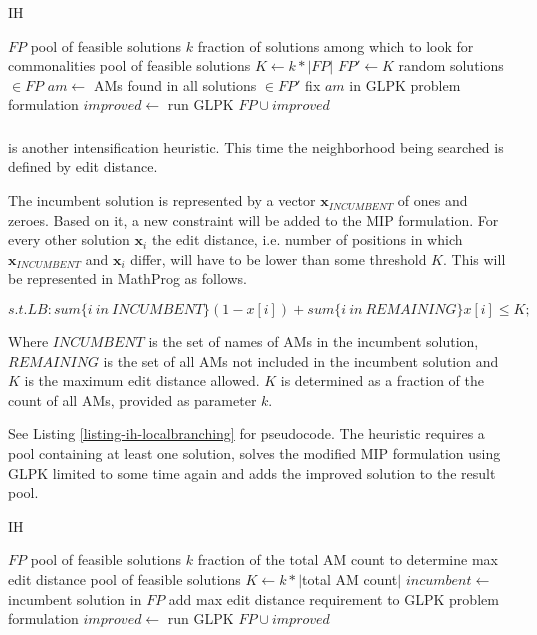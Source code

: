 \begin{algorithm}
\caption{ IH}
\label{listing-ih-crossover}
\begin{algorithmic}
\REQUIRE $FP$ pool of feasible solutions
\REQUIRE $k$ fraction of solutions among which to look for commonalities
\ENSURE pool of feasible solutions
\STATE $K \gets k * |FP|$
\STATE $FP' \gets K$ random solutions $\in FP$
\STATE $am \gets$ AMs found in all solutions $\in FP'$
\STATE fix $am$ in GLPK problem formulation
\STATE $improved \gets $ run GLPK
\RETURN $FP \cup improved$
\end{algorithmic}
\end{algorithm}

\subsubsection{}

 is another intensification heuristic. This time the neighborhood being searched is defined by edit distance.

The incumbent solution is represented by a vector $\mathbf{x}_{INCUMBENT}$ of ones and zeroes. Based on it, a new constraint will be added to the MIP formulation. For every other solution $\mathbf{x}_i$ the edit distance, i.e. number of positions in which $\mathbf{x}_{INCUMBENT}$ and $\mathbf{x}_i$ differ, will have to be lower than some threshold $K$. This will be represented in MathProg as follows.

\[s.t. LB: sum\{i\ in\ INCUMBENT\} (1 - x[i]) + sum\{i\ in\ REMAINING\} x[i] \leq K;\]

Where $INCUMBENT$ is the set of names of AMs in the incumbent solution, $REMAINING$ is the set of all AMs not included in the incumbent solution and $K$ is the maximum edit distance allowed. $K$ is determined as a fraction of the count of all AMs, provided as parameter $k$.

See Listing \ref{listing-ih-localbranching} for pseudocode. The heuristic requires a pool containing at least one solution, solves the modified MIP formulation using GLPK limited to some time again and adds the improved solution to the result pool.\\

\begin{algorithm}
\caption{ IH}
\label{listing-ih-localbranching}
\begin{algorithmic}
\REQUIRE $FP$ pool of feasible solutions
\REQUIRE $k$ fraction of the total AM count to determine max edit distance
\ENSURE pool of feasible solutions
\STATE $K \gets k * |$total AM count$|$
\STATE $incumbent \gets $ incumbent solution in $FP$
\STATE add max edit distance requirement to GLPK problem formulation
\STATE $improved \gets $ run GLPK
\RETURN $FP \cup improved$
\end{algorithmic}
\end{algorithm}

